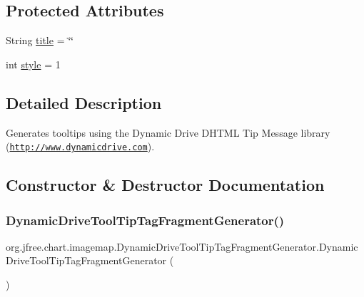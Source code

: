 \subsection*{Protected Attributes}
\begin{DoxyCompactItemize}
\item 
String \mbox{\hyperlink{classorg_1_1jfree_1_1chart_1_1imagemap_1_1_dynamic_drive_tool_tip_tag_fragment_generator_a44b18cbee5e91278dce5646453e80300}{title}} = \char`\"{}\char`\"{}
\item 
int \mbox{\hyperlink{classorg_1_1jfree_1_1chart_1_1imagemap_1_1_dynamic_drive_tool_tip_tag_fragment_generator_ab59865f9d9c46d5e4b171ed26e640457}{style}} = 1
\end{DoxyCompactItemize}


\subsection{Detailed Description}
Generates tooltips using the Dynamic Drive D\+H\+T\+ML Tip Message library (\href{http://www.dynamicdrive.com}{\tt http\+://www.\+dynamicdrive.\+com}). 

\subsection{Constructor \& Destructor Documentation}
\mbox{\label{classorg_1_1jfree_1_1chart_1_1imagemap_1_1_dynamic_drive_tool_tip_tag_fragment_generator_a8066e875d5bd28de059dbe39d519119e}} 
\subsubsection{\texorpdfstring{Dynamic\+Drive\+Tool\+Tip\+Tag\+Fragment\+Generator()}{DynamicDriveToolTipTagFragmentGenerator()}\hspace{0.1cm}{\footnotesize\ttfamily [1/2]}}
{\footnotesize\ttfamily org.\+jfree.\+chart.\+imagemap.\+Dynamic\+Drive\+Tool\+Tip\+Tag\+Fragment\+Generator.\+Dynamic\+Drive\+Tool\+Tip\+Tag\+Fragment\+Generator (\begin{DoxyParamCaption}{ }\end{DoxyParamCaption})}

